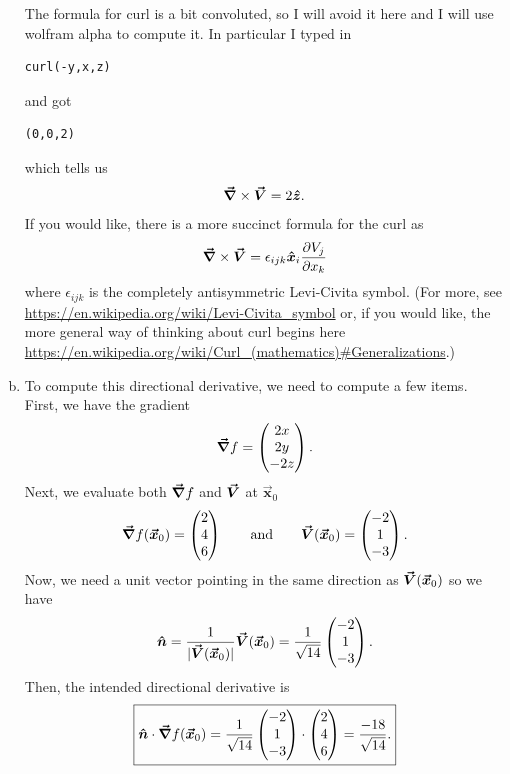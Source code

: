 \documentclass[12pt]{article} %
\newcommand{\vecx}{\boldsymbol{\vec{x}}}
\begin{document}
\begin{solution}
\begin{enumerate}[(a)]
	The formula for curl is a bit convoluted, so I will avoid it here and I will use wolfram alpha to compute it. In particular I typed in 
\begin{verbatim}
curl(-y,x,z)
\end{verbatim}
and got
\begin{verbatim}
(0,0,2)
\end{verbatim}
which tells us
\[
\boldsymbol{\vec{\nabla}} \times \boldsymbol{\vec{V}} = 2\boldsymbol{\hat{z}}.
\]
If you would like, there is a more succinct formula for the curl as
\[
\boldsymbol{\vec{\nabla}} \times \boldsymbol{\vec{V}} = \epsilon_{ijk} \boldsymbol{\hat{x}}_i \frac{\partial V_j}{\partial x_k}
\]
where $\epsilon_{ijk}$ is the completely antisymmetric Levi-Civita symbol. (For more, see \url{https://en.wikipedia.org/wiki/Levi-Civita_symbol} or, if you would like, the more general way of thinking about curl begins here \url{https://en.wikipedia.org/wiki/Curl\_(mathematics)\#Generalizations}.)



    \item To compute this directional derivative, we need to compute a few items. First, we have the gradient
    \[
        \boldsymbol{\vec{\nabla}} f = \begin{pmatrix} 2x \\ 2y \\ -2z \end{pmatrix}.
    \]
    Next, we evaluate both $\boldsymbol{\vec{\nabla}} f$ and $\boldsymbol{\vec{V}}$ at $\vecx_0$
    \[
    \grad f(\vecx_0) = \begin{pmatrix} 2 \\ 4 \\ 6 \end{pmatrix} \qquad \textrm{and} \qquad \vecfieldV(\vecx_0) = \begin{pmatrix} -2 \\ 1 \\ -3 \end{pmatrix}.
    \]
    Now, we need a unit vector pointing in the same direction as $\vecfieldV(\vecx_0)$ so we have
    \[
    \unitvec = \frac{1}{|\vecfieldV(\vecx_0)|} \vecfieldV(\vecx_0) = \frac{1}{\sqrt{14}} \begin{pmatrix} -2 \\ 1 \\ -3 \end{pmatrix}.
    \]
    Then, the intended directional derivative is
    \[
    \boxed{\unitvec\cdot \grad f(\vecx_0) = \frac{1}{\sqrt{14}} \begin{pmatrix} -2 \\ 1 \\ -3 \end{pmatrix} \cdot \begin{pmatrix} 2 \\ 4 \\ 6 \end{pmatrix} = \frac{-18}{\sqrt{14}}.}
    \]
\end{enumerate}
\end{solution}
\end{document}
